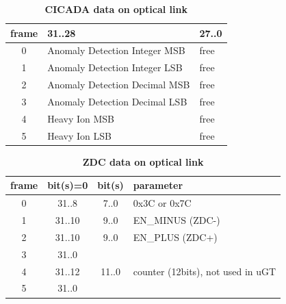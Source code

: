 \documentclass{cmspaper}
\begin{document}
\begin{table}[ht]
\caption{\bf CICADA data on optical link}
\vspace{5mm}
\centering
\begin{tabular}{|c|l|l|}\hline
frame & 31..28 & 27..0\\\hline\hline
0 & Anomaly Detection Integer MSB & free \\\hline
1 & Anomaly Detection Integer LSB & free \\\hline
2 & Anomaly Detection Decimal MSB & free \\\hline
3 & Anomaly Detection Decimal LSB & free \\\hline
4 & Heavy Ion MSB & free \\\hline
5 & Heavy Ion LSB & free \\\hline
\end{tabular}
\label{table:opt_link_cicada}
\end{table}

% 

\begin{table}[ht]
\caption{\bf ZDC data on optical link}
\vspace{5mm}
\centering
\begin{tabular}{|c|c|c|l|}\hline
frame & bit(s)=0 & bit(s) & parameter \\\hline\hline
0 & 31..8 & 7..0 & 0x3C or 0x7C\\
1 & 31..10 & 9..0 & EN\_MINUS (ZDC-)\\
2 & 31..10 & 9..0 & EN\_PLUS (ZDC+)\\
3 & 31..0 & &\\
4 & 31..12 & 11..0 & counter (12bits), not used in uGT\\
5 & 31..0 & &\\\hline

\end{tabular}
\label{table:opt_link_zdc}
\end{table}

\clearpage
\end{document}
